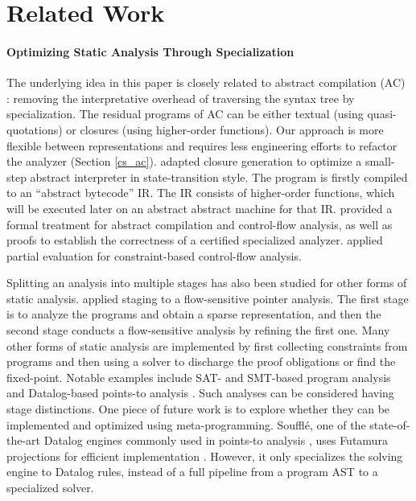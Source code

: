 \section{Related Work}

\paragraph{Optimizing Static Analysis Through Specialization} The underlying
idea in this paper is closely related to abstract compilation (AC)
\cite{Boucher:1996:ACN:647473.727587}: removing the interpretative overhead of
traversing the syntax tree by specialization. The residual programs of AC can
be either textual (using quasi-quotations) or closures (using higher-order
functions).  Our approach is more flexible between representations and requires
less engineering efforts to refactor the analyzer (Section \ref{cs_ac}).
\citet{Johnson:2013:OAA:2500365.2500604} adapted closure generation to optimize a
small-step abstract interpreter in state-transition style. The program
is firstly compiled to an ``abstract bytecode'' IR. The IR consists of higher-order
functions, which will be executed later on an abstract abstract machine for
that IR.  \citet{damian1999partial} provided a formal treatment for abstract
compilation and control-flow analysis, as well as proofs to establish the
correctness of a certified specialized analyzer.  \citet{amtoft1999partial}
applied partial evaluation for constraint-based control-flow analysis.

Splitting an analysis into multiple stages has also been studied for other
forms of static analysis.
\citet{DBLP:conf/cgo/HardekopfL11} applied staging to a
flow-sensitive pointer analysis. The first stage is to analyze the
programs and obtain a sparse representation, and then the second
stage conducts a flow-sensitive analysis by refining the first
one. Many other forms of static analysis are implemented by
first collecting constraints from programs and then using a solver to discharge
the proof obligations or find the fixed-point. Notable examples include SAT-
and SMT-based program analysis
\cite{Gulwani:2008:PAC:1375581.1375616} and Datalog-based points-to
analysis \cite{Smaragdakis:2015:PA:2802194.2802195}.
Such analyses can be considered having stage distinctions.  One piece of future
work is to explore whether they can be implemented and optimized using
meta-programming.
Souffl{\'e}, one of the state-of-the-art Datalog engines commonly used in
points-to analysis \cite{Antoniadis:2017:PDS:3088515.3088522}, uses Futamura
projections for efficient implementation \cite{10.1007/978-3-319-41540-6_23}.
However, it only specializes the solving engine to Datalog rules, instead of a
full pipeline from a program AST to a specialized solver.

